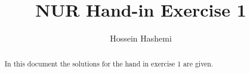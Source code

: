 \documentclass[a4paper,10pt]{article}
\title{NUR Hand-in Exercise 1}
\author{Hossein Hashemi}
\begin{document}
\maketitle

\begin{abstract}
 In this document the solutions for the hand in exercise 1 are
 given.
\end{abstract}


\end{document}
